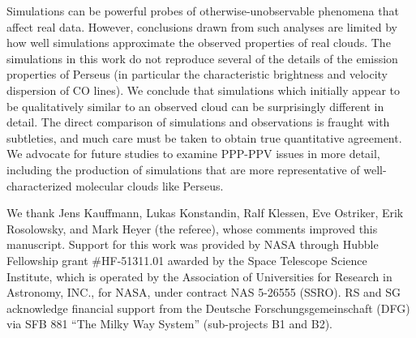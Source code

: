 Simulations can be powerful probes of otherwise-unobservable phenomena that affect real data. However, conclusions drawn from such analyses are
limited by how well simulations approximate the observed properties of real clouds. The simulations in this work do not reproduce several of the details of the emission properties of Perseus (in particular the characteristic brightness and velocity dispersion of CO lines). We conclude that simulations which initially appear to be qualitatively similar to an observed cloud can be surprisingly different in detail. The direct comparison of simulations and observations is fraught with subtleties, and much care must be taken to obtain true quantitative agreement. We advocate for future studies to examine PPP-PPV issues in more detail, including the production of simulations that are more representative of well-characterized molecular clouds like Perseus.

We thank  Jens Kauffmann, Lukas Konstandin, Ralf Klessen, Eve Ostriker,  Erik Rosolowsky, and Mark Heyer (the referee), whose comments improved this manuscript. Support for this work was provided by NASA through Hubble Fellowship grant \#HF-51311.01 awarded by the Space Telescope Science Institute, which is operated by the Association of Universities for Research in Astronomy, INC., for NASA, under contract NAS 5-26555 (SSRO). RS and SG acknowledge financial support from the Deutsche Forschungsgemeinschaft (DFG) via SFB 881 ``The Milky Way System'' (sub-projects B1 and B2).


